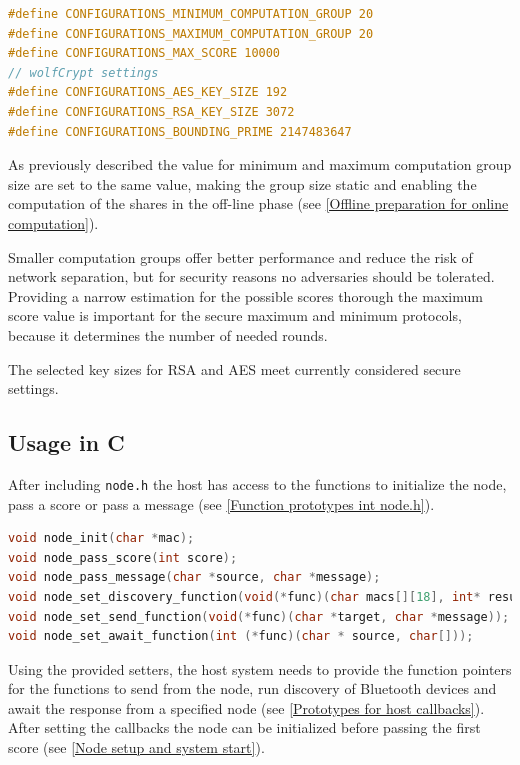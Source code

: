 \begin{lstlisting}[language=C, caption={Definitions in configurations.h}, label={Definitions in configurations.h}, float, floatplacement=H]
#define CONFIGURATIONS_MINIMUM_COMPUTATION_GROUP 20
#define CONFIGURATIONS_MAXIMUM_COMPUTATION_GROUP 20
#define CONFIGURATIONS_MAX_SCORE 10000
// wolfCrypt settings
#define CONFIGURATIONS_AES_KEY_SIZE 192
#define CONFIGURATIONS_RSA_KEY_SIZE 3072
#define CONFIGURATIONS_BOUNDING_PRIME 2147483647
\end{lstlisting}

As previously described the value for minimum and maximum computation group size are set to the same value, making the group size static and enabling the computation of the shares in the off-line phase (see \autoref{Offline preparation for online computation}). 

Smaller computation groups offer better performance and reduce the risk of network separation, but for security reasons no adversaries should be tolerated. Providing a narrow estimation for the possible scores thorough the maximum score value is important for the secure maximum and minimum protocols, because it determines the number of needed rounds.

The selected key sizes for \gls{RSA} and \gls{AES} meet currently considered secure settings.  

\subsection{Usage in C}	\label{Usage in C}

After including \lstinline|node.h| the host has access to the functions to initialize the node, pass a score or pass a message (see \autoref{Function prototypes int node.h}). 

\begin{lstlisting}[language=C, caption={Function prototypes int node.h}, label={Function prototypes int node.h}, float, floatplacement=H]
void node_init(char *mac);
void node_pass_score(int score);
void node_pass_message(char *source, char *message);
void node_set_discovery_function(void(*func)(char macs[][18], int* result_count));
void node_set_send_function(void(*func)(char *target, char *message));
void node_set_await_function(int (*func)(char * source, char[]));
\end{lstlisting}

Using the provided setters, the host system needs to provide the function pointers for the functions to send from the node, run discovery of Bluetooth devices and await the response from a specified node (see \autoref{Prototypes for host callbacks}). After setting the callbacks the node can be initialized before passing the first score (see \autoref{Node setup and system start}).

